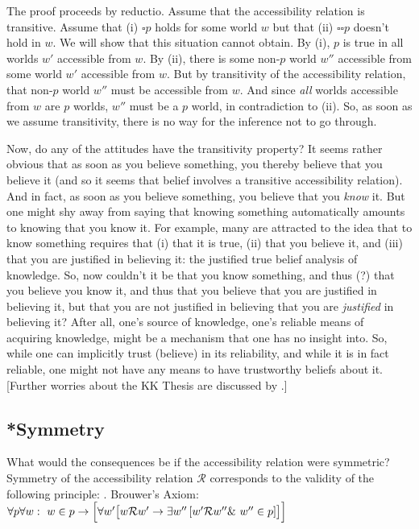 The proof proceeds by reductio. Assume that the accessibility relation is transitive. Assume that (i) $\square p$ holds for some world $w$ but that (ii) $\square \square p$ doesn't hold in $w$. We will show that this situation cannot obtain. By (i), $p$ is true in all worlds $w'$ accessible from $w$. By (ii), there is some non-$p$ world $w''$ accessible from some world $w'$ accessible from $w$. But by transitivity of the accessibility relation, that non-$p$ world $w''$ must be accessible from $w$. And since \emph{all} worlds accessible from $w$ are $p$ worlds, $w''$ must be a $p$ world, in contradiction to (ii). So, as soon as we assume transitivity, there is no way for the inference not to go through.

Now, do any of the attitudes have the transitivity property? It seems rather obvious that as soon as you believe something, you thereby believe that you believe it (and so it seems that belief involves a transitive accessibility relation). And in fact, as soon as you believe something, you believe that you \emph{know} it. But one might shy away from saying that knowing something automatically amounts to knowing that you know it. For example, many are attracted to the idea that to know something requires that (i) that it is true, (ii) that you believe it, and (iii) that you are justified in believing it: the justified true belief analysis of knowledge. So, now couldn't it be that you know something, and thus (?) that you believe you know it, and thus that you believe that you are justified in believing it, but that you are not justified in believing that you are \emph{justified} in believing it? After all, one's source of knowledge, one's reliable means of acquiring knowledge, might be a mechanism that one has no insight into. So, while one can implicitly trust (believe) in its reliability, and while it is in fact reliable, one might not have any means to have trustworthy beliefs about it. [Further worries about the KK Thesis are discussed by \citet{williamson:2000:limits}.]

\subsection{*Symmetry}

What would the consequences be if the accessibility relation were symmetric? Symmetry of the accessibility relation $\mathcal{R}$ corresponds to the validity of the following principle:
\newpage
\ex. Brouwer's Axiom:\\
$\forall p \forall w:\ w\in p \rightarrow \Bigl[\forall w' \bigl[ w\mathcal{R}w' \rightarrow \exists w'' \left[ w'\mathcal{R}w'' \&\ w''\in p\right]\bigr]\Bigr]$
%

